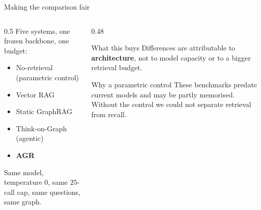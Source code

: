 \documentclass[aspectratio=169,12pt]{beamer}
\begin{document}
\begin{frame}{Making the comparison fair}
  \begin{columns}[T]
    \begin{column}{0.5\textwidth}
      \small
      Five systems, \alert{one frozen backbone}, \alert{one budget}:
      \begin{itemize}
        \item No-retrieval (parametric control)
        \item Vector RAG
        \item Static GraphRAG
        \item Think-on-Graph (agentic)
        \item \textbf{AGR}
      \end{itemize}
      \vspace{2mm}
      Same model, temperature $0$, same $25$-call cap, same questions, same
      graph.
    \end{column}
    \begin{column}{0.48\textwidth}
      \begin{block}{What this buys}
        \small
        Differences are attributable to \textbf{architecture}, not to model
        capacity or to a bigger retrieval budget.
      \end{block}
      \vspace{1mm}
      \begin{block}{Why a parametric control}
        \small
        These benchmarks predate current models and may be partly memorised.
        Without the control we could not separate retrieval from recall.
      \end{block}
    \end{column}
  \end{columns}
\end{frame}
\end{document}

